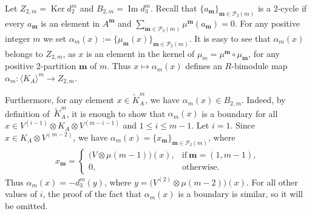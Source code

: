 \documentclass[pdftex]{sigma}
\newcommand{\bs}[1]{\boldsymbol{#1}}
\DeclareMathOperator{\Ker}{Ker}
\DeclareMathOperator{\im}{Im}
\newcommand\ot{\otimes}
\newcommand{\gen}[1]{\langle #1 \rangle}
\def\m{\mu}
\newcommand{\Pa}[2]{\mathscr{P}_{#2}(#1)}
\renewcommand{\^}[1]{\mbox{$^{\left( #1 \right)}$}}
\renewcommand{\_}[1]{\mbox{$_{\left( #1 \right)}$}}
\numberwithin{equation}{section}
\begin{document}
Let $Z_{2,m}=\Ker d_2^m$ and $B_{2,m}=\im d_3^m$. Recall that $\{a_{\boldsymbol{m}}\}_{\boldsymbol{m}\in\mathscr{P}_2(m)}$ is a $2$-cycle if every $ a_{\boldsymbol{m}}$ is an element in $A^{\boldsymbol{m}}$ and $\sum\limits_{\boldsymbol{m}\in\mathscr{P}_2 (m)} \mu^{\boldsymbol{m}}(a_{\boldsymbol{m}})=0$. For any positive integer $m$ we set $\alpha_m(x):=\big\{ \mu_{\bs{m}}(x)\big\}_{\bs{m}\in \Pa{m}{2}}$. It is easy to see that $\alpha_m(x)$ belongs to $Z_{2,m}$, as $x$ is an element in the kernel of $\mu_m=\mu^{\bs{m}}\circ\mu_{\bs{m}}$, for any positive $2$-partition $\bs{m}$ of $m$. Thus $x\mapsto \alpha_m(x)$ def\/ines an $R$-bimodule map $\alpha_m\colon \gen{K_A}^m \to Z_{2,m}$.

Furthermore, for any element $x\in\widetilde{K}_A^m$, we have $\alpha_m(x)\in B_{2,m}$. Indeed, by def\/inition of~$\widetilde{K}_A^m$, it is enough to show that $\alpha_m(x)$ is a boundary for all $x\in V^{(i-1)}\ot K_A\ot V^{(m-i-1)}$ and $1\leq i\leq m-1$. Let $i=1$. Since $x\in K_A\ot V^{(m-2)}$, we have $\alpha_m(x)=\{x_{\bs{m}}\}_{\bs{m}\in\Pa{m}{2}}$, where
\begin{gather*}
x_{\bs{m}}=\begin{cases}
 \big(V\otimes \m(m-1)\big)(x), & \text{if} \ \bs{m}=(1,m-1), \\
 0, & \text{otherwise}.
 \end{cases}
\end{gather*}
Thus $\alpha_m(x)=-d_3^m(y)$, where $y=\big(V^{(2)}\ot\m(m-2)\big)(x)$. For all other values of $i$, the proof of the fact that $\alpha_m(x)$ is a boundary is similar, so it will be omitted.
\end{document}
